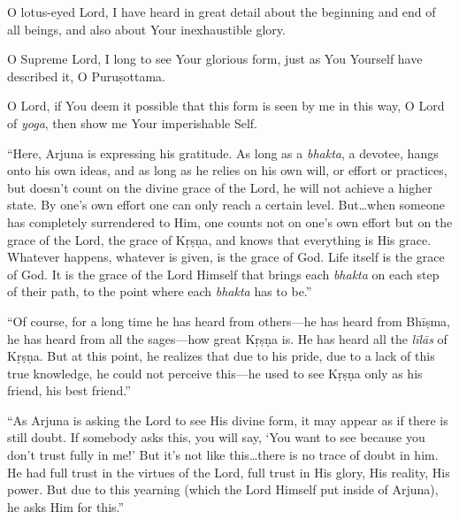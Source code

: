 {O lotus-eyed Lord, I have heard in great detail about the beginning and end of all beings, and also about Your inexhaustible glory.}

{O Supreme Lord, I long to see Your glorious form, just as You Yourself have described it, O Puruṣottama.}

{O Lord, if You deem it possible that this form is seen by me in this way, O Lord of \textit{yoga}, then show me Your imperishable Self.}

\enquote{Here, Arjuna is expressing his gratitude. As long as a \textit{bhakta}, a devotee, hangs onto his own ideas, and as long as he relies on his own will, or effort or practices, but doesn’t count on the divine grace of the Lord, he will not achieve a higher state. By one’s own effort one can only reach a certain level. But\ldots when someone has completely surrendered to Him, one counts not on one’s own effort but on the grace of the Lord, the grace of Kṛṣṇa, and knows that everything is His grace. Whatever happens, whatever is given, is the grace of God. Life itself is the grace of God. It is the grace of the Lord Himself that brings each \textit{bhakta} on each step of their path, to the point where each \textit{bhakta} has to be.}

\enquote{Of course, for a long time he has heard from others---he has heard from Bhīṣma, he has heard from all the sages---how great Kṛṣṇa is. He has heard all the \textit{līlās} of Kṛṣṇa. But at this point, he realizes that due to his pride, due to a lack of this true knowledge, he could not perceive this---he used to see Kṛṣṇa only as his friend, his best friend.}

\enquote{As Arjuna is asking the Lord to see His divine form, it may appear as if there is still doubt. If somebody asks this, you will say, \enquote{You want to see because you don’t trust fully in me!} But it’s not like this\ldots there is no trace of doubt in him. He had full trust in the virtues of the Lord, full trust in His glory, His reality, His power. But due to this yearning (which the Lord Himself put inside of Arjuna), he asks Him for this.}

